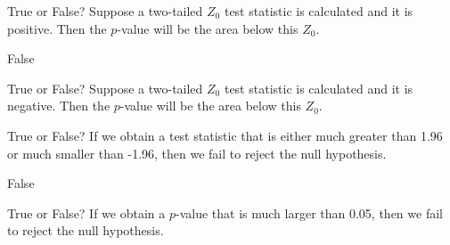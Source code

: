 \documentclass[11pt, chapterprefix=true]{scrbook}\usepackage[]{graphicx}\usepackage[]{color}
\begin{document}
\begin{exercises}
\begin{exercise}
\end{exercise}
% 
% 

\begin{exercise} %

True or False? Suppose a two-tailed $Z_0$ test statistic is calculated and it is positive. Then the $p$-value will be the area below this $Z_0$.

\end{exercise}
\begin{solution} %

False

\end{solution}

\begin{exercise} %

True or False? Suppose a two-tailed $Z_0$ test statistic is calculated and it is negative. Then the $p$-value will be the area below this $Z_0$.

\end{exercise}
% 
% 

\begin{exercise} %

True or False? If we obtain a test statistic that is either much greater than 1.96 or much smaller than -1.96, then we fail to reject the null hypothesis.

\end{exercise}
\begin{solution} %

False 

\end{solution}


\begin{exercise} %

True or False? If we obtain a $p$-value that is much larger than 0.05, then we fail to reject the null hypothesis.

\end{exercise}
% 
% 






\end{exercises}
\end{document}
